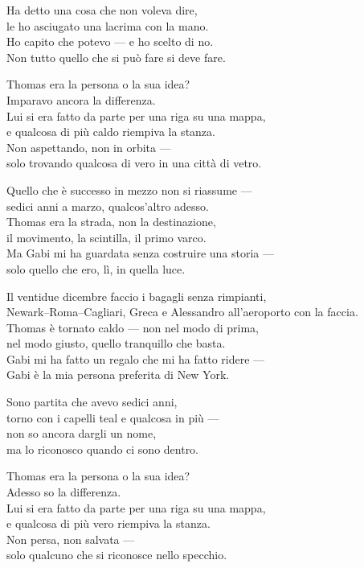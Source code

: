 \begin{lyrics}
Ha detto una cosa che non voleva dire,\\
le ho asciugato una lacrima con la mano.\\
Ho capito che potevo — e ho scelto di no.\\
Non tutto quello che si può fare si deve fare.

Thomas era la persona o la sua idea?\\
Imparavo ancora la differenza.\\
Lui si era fatto da parte per una riga su una mappa,\\
e qualcosa di più caldo riempiva la stanza.\\
Non aspettando, non in orbita —\\
solo trovando qualcosa di vero in una città di vetro.

Quello che è successo in mezzo non si riassume —\\
sedici anni a marzo, qualcos'altro adesso.\\
Thomas era la strada, non la destinazione,\\
il movimento, la scintilla, il primo varco.\\
Ma Gabi mi ha guardata senza costruire una storia —\\
solo quello che ero, lì, in quella luce.

Il ventidue dicembre faccio i bagagli senza rimpianti,\\
Newark–Roma–Cagliari, Greca e Alessandro all'aeroporto con la faccia.\\
Thomas è tornato caldo — non nel modo di prima,\\
nel modo giusto, quello tranquillo che basta.\\
Gabi mi ha fatto un regalo che mi ha fatto ridere —\\
Gabi è la mia persona preferita di New York.

Sono partita che avevo sedici anni,\\
torno con i capelli teal e qualcosa in più —\\
non so ancora dargli un nome,\\
ma lo riconosco quando ci sono dentro.

Thomas era la persona o la sua idea?\\
Adesso so la differenza.\\
Lui si era fatto da parte per una riga su una mappa,\\
e qualcosa di più vero riempiva la stanza.\\
Non persa, non salvata —\\
solo qualcuno che si riconosce nello specchio.


\end{lyrics}
